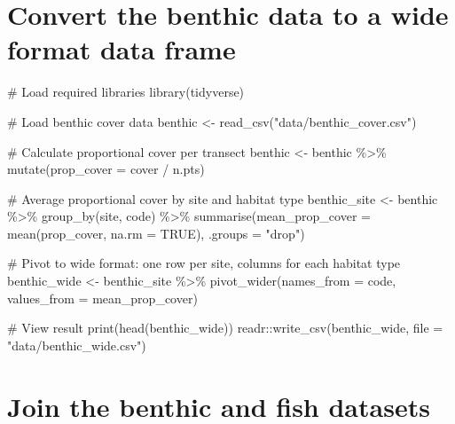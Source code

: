 \documentclass[
  letterpaper,
  DIV=11,
  numbers=noendperiod]{scrreprt}
\newenvironment{Shaded}{\begin{snugshade}}{\end{snugshade}}
\newcommand{\AttributeTok}[1]{\textcolor[rgb]{0.40,0.45,0.13}{#1}}
\newcommand{\CommentTok}[1]{\textcolor[rgb]{0.37,0.37,0.37}{#1}}
\newcommand{\ConstantTok}[1]{\textcolor[rgb]{0.56,0.35,0.01}{#1}}
\newcommand{\FunctionTok}[1]{\textcolor[rgb]{0.28,0.35,0.67}{#1}}
\newcommand{\NormalTok}[1]{\textcolor[rgb]{0.00,0.23,0.31}{#1}}
\newcommand{\OtherTok}[1]{\textcolor[rgb]{0.00,0.23,0.31}{#1}}
\newcommand{\SpecialCharTok}[1]{\textcolor[rgb]{0.37,0.37,0.37}{#1}}
\newcommand{\StringTok}[1]{\textcolor[rgb]{0.13,0.47,0.30}{#1}}
\begin{document}
\section{Convert the benthic data to a wide format data
frame}\label{convert-the-benthic-data-to-a-wide-format-data-frame}

\begin{Shaded}
\begin{Highlighting}[]
\CommentTok{\# Load required libraries}
\FunctionTok{library}\NormalTok{(tidyverse)}

\CommentTok{\# Load benthic cover data}
\NormalTok{benthic }\OtherTok{\textless{}{-}} \FunctionTok{read\_csv}\NormalTok{(}\StringTok{"data/benthic\_cover.csv"}\NormalTok{)}

\CommentTok{\# Calculate proportional cover per transect}
\NormalTok{benthic }\OtherTok{\textless{}{-}}\NormalTok{ benthic }\SpecialCharTok{\%\textgreater{}\%}
    \FunctionTok{mutate}\NormalTok{(}\AttributeTok{prop\_cover =}\NormalTok{ cover }\SpecialCharTok{/}\NormalTok{ n.pts)}

\CommentTok{\# Average proportional cover by site and habitat type}
\NormalTok{benthic\_site }\OtherTok{\textless{}{-}}\NormalTok{ benthic }\SpecialCharTok{\%\textgreater{}\%}
    \FunctionTok{group\_by}\NormalTok{(site, code) }\SpecialCharTok{\%\textgreater{}\%}
    \FunctionTok{summarise}\NormalTok{(}\AttributeTok{mean\_prop\_cover =} \FunctionTok{mean}\NormalTok{(prop\_cover, }\AttributeTok{na.rm =} \ConstantTok{TRUE}\NormalTok{), }\AttributeTok{.groups =} \StringTok{"drop"}\NormalTok{)}

\CommentTok{\# Pivot to wide format: one row per site, columns for each habitat type}
\NormalTok{benthic\_wide }\OtherTok{\textless{}{-}}\NormalTok{ benthic\_site }\SpecialCharTok{\%\textgreater{}\%}
    \FunctionTok{pivot\_wider}\NormalTok{(}\AttributeTok{names\_from =}\NormalTok{ code, }\AttributeTok{values\_from =}\NormalTok{ mean\_prop\_cover)}

\CommentTok{\# View result}
\FunctionTok{print}\NormalTok{(}\FunctionTok{head}\NormalTok{(benthic\_wide))}
\NormalTok{readr}\SpecialCharTok{::}\FunctionTok{write\_csv}\NormalTok{(benthic\_wide, }\AttributeTok{file =} \StringTok{"data/benthic\_wide.csv"}\NormalTok{)}
\end{Highlighting}
\end{Shaded}

\section{Join the benthic and fish
datasets}\label{join-the-benthic-and-fish-datasets}
\end{document}
